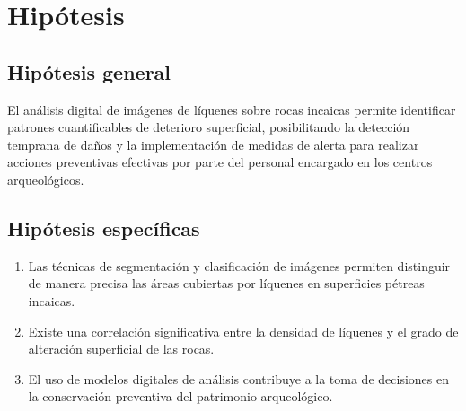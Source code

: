 \chapter{Hipótesis}

\section{Hipótesis general}

El análisis digital de imágenes de líquenes sobre rocas incaicas permite identificar patrones cuantificables de deterioro superficial, posibilitando la detección temprana de daños y la implementación de medidas de alerta para realizar acciones preventivas efectivas por parte del personal encargado en los centros arqueológicos.

\section{Hipótesis específicas}
\begin{enumerate}
    \item Las técnicas de segmentación y clasificación de imágenes permiten distinguir de manera precisa las áreas cubiertas por líquenes en superficies pétreas incaicas.
    \item Existe una correlación significativa entre la densidad de líquenes y el grado de alteración superficial de las rocas.
    \item El uso de modelos digitales de análisis contribuye a la toma de decisiones en la conservación preventiva del patrimonio arqueológico.
\end{enumerate}
